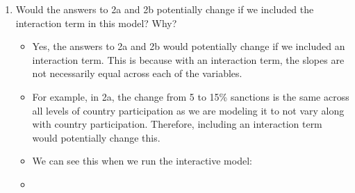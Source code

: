 \documentclass[12pt,letterpaper]{article}
\begin{document}
\begin{enumerate}
\begin{enumerate}
\begin{itemize}
		\end{itemize} 
		\item
		Would the answers to 2a and 2b potentially change if we included the interaction term in this model? Why? 
		
		
		
		\begin{itemize}
			\item Yes, the answers to 2a and 2b would potentially change if we included an interaction term. This is because with an interaction term, the slopes are not necessarily equal across each of the variables.
			\item For example, in 2a, the change from 5 to 15\% sanctions is the same across all levels of country participation as we are modeling it to not vary along with country participation. Therefore, including an interaction term would potentially change this.
			
			\item We can see this when we run the interactive model:
			\item 
			

\end{itemize}
\end{enumerate}
\end{enumerate}
\end{document}
